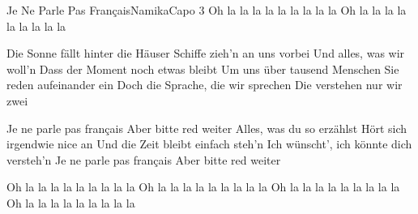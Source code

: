 \begin{song}{Je Ne Parle Pas Français}{Namika}{Capo 3}
Oh la la la la la la la la la
Oh la la la la la la la la la

Die Sonne fällt hinter die Häuser
Schiffe zieh'n an uns vorbei
Und alles, was wir woll'n
Dass der Moment noch etwas bleibt
Um uns über tausend Menschen
Sie reden aufeinander ein
Doch die Sprache, die wir sprechen
Die verstehen nur wir zwei

Je ne parle pas français
Aber bitte red weiter
Alles, was du so erzählst
Hört sich irgendwie nice an
Und die Zeit bleibt einfach steh'n
Ich wünscht', ich könnte dich versteh'n
Je ne parle pas français
Aber bitte red weiter

Oh la la la la la la la la la
Oh la la la la la la la la la
Oh la la la la la la la la la
Oh la la la la la la la la la
\end{song}